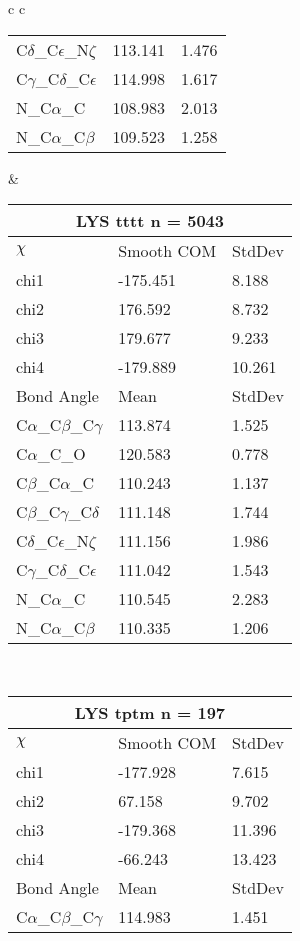 \begin{longtable}{ c c }
\begin{tabular}{ l l l }
  C$\delta$\_C$\epsilon$\_N$\zeta$ & 113.141 & 1.476\\
  C$\gamma$\_C$\delta$\_C$\epsilon$ & 114.998 & 1.617\\
  N\_C$\alpha$\_C & 108.983 & 2.013\\
  N\_C$\alpha$\_C$\beta$ & 109.523 & 1.258\\
  \bottomrule
  \end{tabular}
  &
  \begin{tabular}{ l l l }
  \toprule
  \multicolumn{3}{c}{LYS \textbf{tttt} n = 5043} \\ \toprule
  $\chi$       & Smooth COM & StdDev \\ \midrule
  chi1 & -175.451 & 8.188 \\ 
  chi2 & 176.592 & 8.732 \\ 
  chi3 & 179.677 & 9.233 \\ 
  chi4 & -179.889 & 10.261 \\ \midrule
  Bond Angle   & Mean     & StdDev \\ \midrule
  C$\alpha$\_C$\beta$\_C$\gamma$ & 113.874 & 1.525\\
  C$\alpha$\_C\_O & 120.583 & 0.778\\
  C$\beta$\_C$\alpha$\_C & 110.243 & 1.137\\
  C$\beta$\_C$\gamma$\_C$\delta$ & 111.148 & 1.744\\
  C$\delta$\_C$\epsilon$\_N$\zeta$ & 111.156 & 1.986\\
  C$\gamma$\_C$\delta$\_C$\epsilon$ & 111.042 & 1.543\\
  N\_C$\alpha$\_C & 110.545 & 2.283\\
  N\_C$\alpha$\_C$\beta$ & 110.335 & 1.206\\
  \bottomrule
  \end{tabular}
  \\
  \begin{tabular}{ l l l }
  \toprule
  \multicolumn{3}{c}{LYS \textbf{tptm} n = 197} \\ \toprule
  $\chi$       & Smooth COM & StdDev \\ \midrule
  chi1 & -177.928 & 7.615 \\ 
  chi2 & 67.158 & 9.702 \\ 
  chi3 & -179.368 & 11.396 \\ 
  chi4 & -66.243 & 13.423 \\ \midrule
  Bond Angle   & Mean     & StdDev \\ \midrule
  C$\alpha$\_C$\beta$\_C$\gamma$ & 114.983 & 1.451\\

\end{tabular}
\end{longtable}
